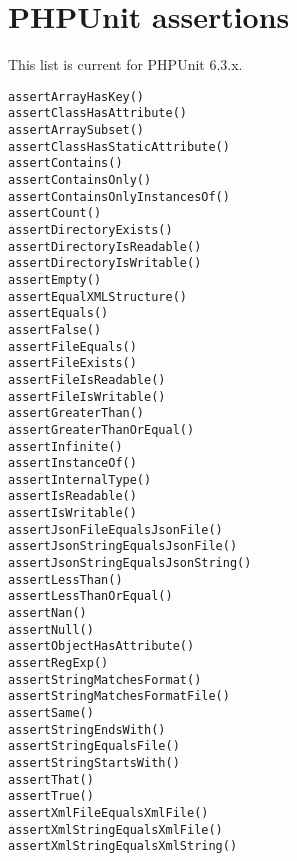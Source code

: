 \documentclass[a4paper,11pt,headsepline]{scrartcl}
\begin{document}
\pagebreak
\section{PHPUnit assertions}
This list is current for PHPUnit 6.3.x.

\begin{verbatim}
assertArrayHasKey()
assertClassHasAttribute()
assertArraySubset()
assertClassHasStaticAttribute()
assertContains()
assertContainsOnly()
assertContainsOnlyInstancesOf()
assertCount()
assertDirectoryExists()
assertDirectoryIsReadable()
assertDirectoryIsWritable()
assertEmpty()
assertEqualXMLStructure()
assertEquals()
assertFalse()
assertFileEquals()
assertFileExists()
assertFileIsReadable()
assertFileIsWritable()
assertGreaterThan()
assertGreaterThanOrEqual()
assertInfinite()
assertInstanceOf()
assertInternalType()
assertIsReadable()
assertIsWritable()
assertJsonFileEqualsJsonFile()
assertJsonStringEqualsJsonFile()
assertJsonStringEqualsJsonString()
assertLessThan()
assertLessThanOrEqual()
assertNan()
assertNull()
assertObjectHasAttribute()
assertRegExp()
assertStringMatchesFormat()
assertStringMatchesFormatFile()
assertSame()
assertStringEndsWith()
assertStringEqualsFile()
assertStringStartsWith()
assertThat()
assertTrue()
assertXmlFileEqualsXmlFile()
assertXmlStringEqualsXmlFile()
assertXmlStringEqualsXmlString()
\end{verbatim}


\end{document}
